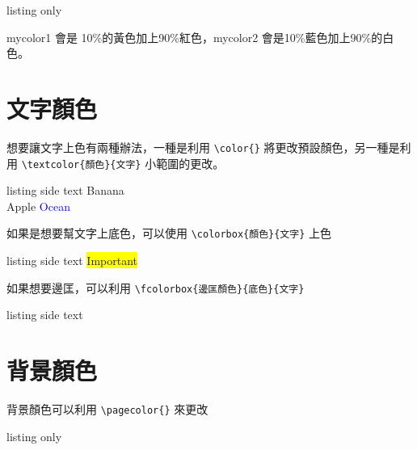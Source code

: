\begin{tcblisting}{listing only}
\end{tcblisting}

mycolor1 會是 10\%的黃色加上90\%紅色，mycolor2 會是10\%藍色加上90\%的白色。

\section{文字顏色}

想要讓文字上色有兩種辦法，一種是利用 \verb|\color{}| 將更改預設顏色，另一種是利用 \verb|\textcolor{顏色}{文字}| 小範圍的更改。

\begin{tcblisting}{listing side text}
\color{yellow}
Banana\\
\color{red}
Apple \textcolor{blue}{Ocean}
\end{tcblisting}

如果是想要幫文字上底色，可以使用 \verb|\colorbox{顏色}{文字}| 上色

\begin{tcblisting}{listing side text}
\colorbox{yellow}{Important}
\end{tcblisting}

如果想要邊匡，可以利用 \verb|\fcolorbox{邊匡顏色}{底色}{文字}|

\begin{tcblisting}{listing side text}
\\
\end{tcblisting}

\section{背景顏色}

背景顏色可以利用 \verb|\pagecolor{}| 來更改

\begin{tcblisting}{listing only}
\pagecolor{red}
\end{tcblisting}